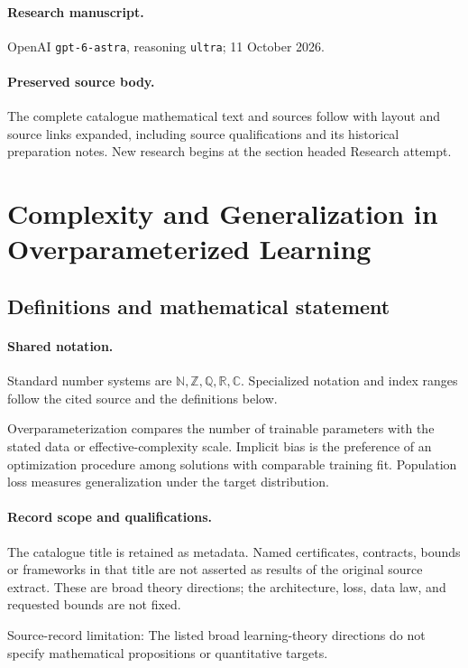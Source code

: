 \documentclass[11pt]{article}
\begin{document}
\paragraph{Research manuscript.} OpenAI \texttt{gpt-6-astra}, reasoning \texttt{ultra}; 11 October 2026.
\paragraph{Preserved source body.} The complete catalogue mathematical text and sources follow with layout and source links expanded, including source qualifications and its historical preparation notes. New research begins at the section headed Research attempt.

\section{Complexity and Generalization in Overparameterized Learning}\label{statement}

\subsection{Definitions and mathematical statement}

\paragraph{Shared notation.}Standard number systems are $\mathbb N,\mathbb Z,\mathbb Q,\mathbb R,\mathbb C$. Specialized notation and index ranges follow the cited source and the definitions below.


Overparameterization compares the number of trainable parameters with the stated data or effective-complexity scale. Implicit bias is the preference of an optimization procedure among solutions with comparable training fit. Population loss measures generalization under the target distribution.
\paragraph{Record scope and qualifications.}
The catalogue title is retained as metadata. Named certificates, contracts, bounds or frameworks in that title are not asserted as results of the original source extract.
These are broad theory directions; the architecture, loss, data law, and requested bounds are not fixed.

Source-record limitation: The listed broad learning-theory directions do not specify mathematical propositions or quantitative targets.
\end{document}
